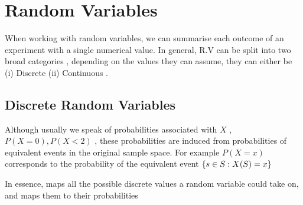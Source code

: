 \section{Random Variables}


	\par{When working with random variables, we can summarise each outcome of an experiment with a single numerical value. In general, R.V can be split into two broad categories ,  depending on the values they can assume, they can either be (i) Discrete (ii) Continuous .}

	\subsection{Discrete Random Variables}






		\par{Although  usually we speak of probabilities associated with $X$ , $P(X = 0) , P(X < 2)$ , these probabilities are induced from probabilities of equivalent events in the original sample space. For example $P(X = x)$ corresponds to the probability of the equivalent event $\{s \in S : X(S) = x\}$}


		\par{In essence,  maps all the possible discrete values a random variable could take on, and maps them to their probabilities}



